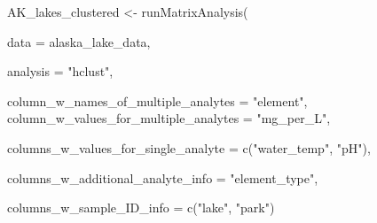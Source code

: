 \documentclass[
]{krantz}
\newenvironment{Shaded}{\begin{snugshade}}{\end{snugshade}}
\newcommand{\AttributeTok}[1]{\textcolor[rgb]{0.77,0.63,0.00}{#1}}
\newcommand{\FunctionTok}[1]{\textcolor[rgb]{0.00,0.00,0.00}{#1}}
\newcommand{\NormalTok}[1]{#1}
\newcommand{\OtherTok}[1]{\textcolor[rgb]{0.56,0.35,0.01}{#1}}
\newcommand{\StringTok}[1]{\textcolor[rgb]{0.31,0.60,0.02}{#1}}
\begin{document}
\begin{Shaded}
\begin{Highlighting}[]
\NormalTok{AK\_lakes\_clustered }\OtherTok{\textless{}{-}} \FunctionTok{runMatrixAnalysis}\NormalTok{(}
                                
    \AttributeTok{data =}\NormalTok{ alaska\_lake\_data,}

    \AttributeTok{analysis =} \StringTok{"hclust"}\NormalTok{,}

    \AttributeTok{column\_w\_names\_of\_multiple\_analytes =} \StringTok{"element"}\NormalTok{,}
    \AttributeTok{column\_w\_values\_for\_multiple\_analytes =} \StringTok{"mg\_per\_L"}\NormalTok{,}
    
    \AttributeTok{columns\_w\_values\_for\_single\_analyte =} \FunctionTok{c}\NormalTok{(}\StringTok{"water\_temp"}\NormalTok{, }\StringTok{"pH"}\NormalTok{),}
    
    \AttributeTok{columns\_w\_additional\_analyte\_info =} \StringTok{"element\_type"}\NormalTok{,}

    \AttributeTok{columns\_w\_sample\_ID\_info =} \FunctionTok{c}\NormalTok{(}\StringTok{"lake"}\NormalTok{, }\StringTok{"park"}\NormalTok{)}


\end{Highlighting}
\end{Shaded}
\end{document}
